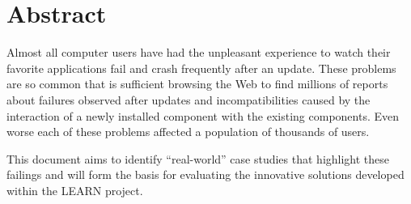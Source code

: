 \documentclass[a4paper,oneside]{scrreprt}
\begin{document}
\section*{Abstract}
Almost all computer users have had the unpleasant experience to watch their
favorite applications fail and crash frequently after an update. These
problems are so common that is sufficient browsing the Web to find millions of reports
about failures observed after updates and incompatibilities caused by the
interaction of a newly installed component with the existing components. Even
worse each of these problems affected a population of thousands of users.

This document aims to identify ``real-world'' case studies
that highlight these failings and will form the basis for evaluating the
innovative solutions developed within the LEARN project.  




\begin{versionhistory}

 
\end{versionhistory}


\tableofcontents
\cleardoublepage











\printnoidxglossaries


\end{document}
